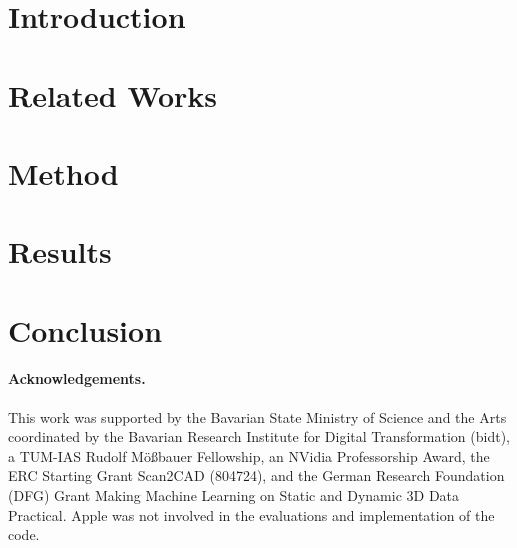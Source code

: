 \documentclass[10pt,twocolumn,letterpaper]{article}
\begin{document}
\maketitle
\ificcvfinal\thispagestyle{empty}\fi



\section{Introduction}


\section{Related Works}


\section{Method}


\section{Results}


\section{Conclusion}


\paragraph{Acknowledgements.}
{
\small
This work was supported by the Bavarian State Ministry of Science and the Arts  coordinated by the Bavarian Research Institute for Digital Transformation (bidt), a TUM-IAS Rudolf M{\"o}{\ss}bauer Fellowship, an NVidia Professorship Award, the ERC Starting Grant Scan2CAD (804724), and the German Research Foundation (DFG) Grant Making Machine Learning on Static and Dynamic 3D Data Practical. Apple was not involved in the evaluations and implementation of the code. 
}

\newpage
{\small


}

\clearpage
\newpage
\begin{appendix}

\end{appendix}
\end{document}
